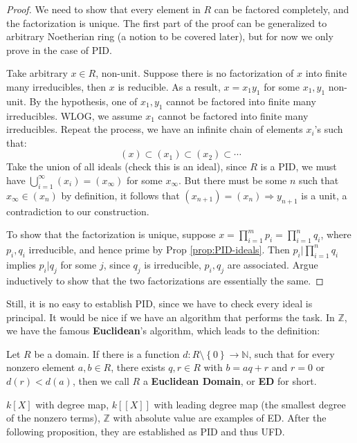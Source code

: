 \documentclass{note-eng}
\begin{document}
\begin{proof}
    We need to show that every element in $R$ can be factored completely, and the factorization is unique. The first part of the proof can be generalized to arbitrary Noetherian ring (a notion to be covered later), but for now we only prove in the case of PID.

    Take arbitrary $x \in R$, non-unit. Suppose there is no factorization of $x$ into finite many irreducibles, then $x$ is reducible. As a result, $x = x_1y_1$ for some $x_1, y_1$ non-unit. By the hypothesis, one of $x_1, y_1$ cannot be factored into finite many irreducibles. WLOG, we assume $x_1$ cannot be factored into finite many irreducibles. Repeat the process, we have an infinite chain of elements $x_i$'s such that:
    $$(x) \subset (x_1) \subset (x_2) \subset \cdots$$
    Take the union of all ideals (check this is an ideal), since $R$ is a PID, we must have $\bigcup\limits_{i = 1}^{\infty} (x_i) = (x_{\infty})$ for some $x_{\infty}$. But there must be some $n$ such that $x_\infty \in (x_n)$ by definition, it follows that $(x_{n + 1}) = (x_n) \Rightarrow y_{n + 1}$ is a unit, a contradiction to our construction.

    To show that the factorization is unique, suppose $x = \prod\limits_{i = 1}^{m} p_i = \prod\limits_{i = 1}^{n} q_i$, where $p_i, q_i$ irreducible, and hence prime by Prop \ref{prop:PID-ideals}. Then $p_i | \prod\limits_{i = 1}^{n} q_i$ implies $p_i | q_j$ for some $j$, since $q_j$ is irreducible, $p_i, q_j$ are associated. Argue inductively to show that the two factorizations are essentially the same.
\end{proof}

Still, it is no easy to establish PID, since we have to check every ideal is principal. It would be nice if we have an algorithm that performs the task. In $\mathbb{Z}$, we have the famous \textbf{Euclidean}'s algorithm, which leads to the definition:

\begin{definition}
    Let $R$ be a domain. If there is a function $d: R \setminus \left\lbrace 0 \right\rbrace \rightarrow \mathbb{N}$, such that for every nonzero element $a, b \in R$, there exists $q, r \in R$ with $b = aq + r$ and $r = 0$ or $d(r) \lt d(a)$, then we call $R$ a \textbf{Euclidean Domain}, or \textbf{ED} for short.
\end{definition}

\begin{example}
    $k[X]$ with degree map, $k[[X]]$ with leading degree map (the smallest degree of the nonzero terms), $\mathbb{Z}$ with absolute value are examples of ED. After the following proposition, they are established as PID and thus UFD.
\end{example}
\end{document}
